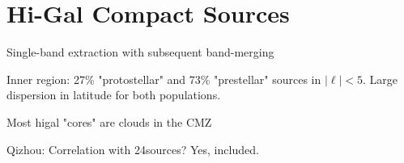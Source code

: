 \section{Hi-Gal Compact Sources}

Single-band extraction with subsequent band-merging

Inner region: 27\% "protostellar" and 73\% "prestellar" sources in $|\ell|<5$.
Large dispersion in latitude for both populations.

Most higal "cores" are clouds in the CMZ

Qizhou: Correlation with 24\um sources?  Yes, included.